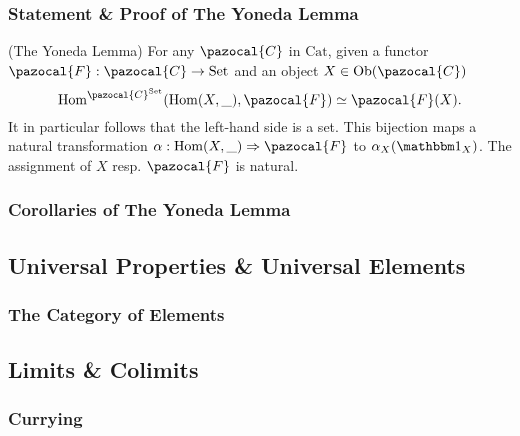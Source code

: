 \subsubsection{Statement \& Proof of The Yoneda Lemma}
\begin{theorem}(The Yoneda Lemma) For any $\pazocal{C}$ in $\mathrm{Cat}$, given a functor $\pazocal{F}:\pazocal{C}\rightarrow \mathrm{Set}$ and an object $X\in \Ob(\pazocal{C})$
$$
    \Hom^{\pazocal{C}^\mathrm{Set}}(\Hom(X,\_),\pazocal{F}) \simeq \pazocal{F}(X).
$$
It in particular follows that the left-hand side is a set. This bijection maps a natural transformation $\alpha: \Hom(X,\_) \Rightarrow \pazocal{F}$ to $\alpha_X(\fone_X)$. The assignment of $X$ resp. $\pazocal{F}$ is natural. 
\end{theorem}
\subsubsection{Corollaries of The Yoneda Lemma}
\subsection{Universal Properties \& Universal Elements}
\subsubsection{The Category of Elements}
\subsection{Limits \& Colimits}

\subsubsection{Currying}